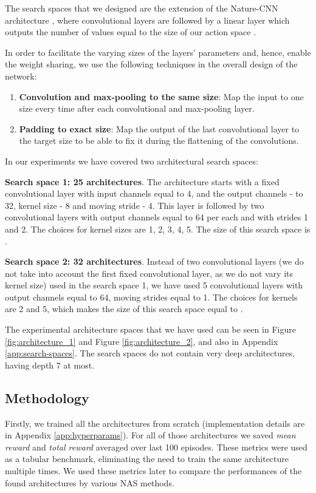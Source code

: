 \documentclass{svproc}
\begin{document}
The search spaces that we designed are the extension of the Nature-CNN architecture \cite{Humanlevel2015}, where convolutional layers are followed by
a linear layer which outputs the number of values equal to the size of our action space \cite{Humanlevel2015}. 




In order to facilitate the varying sizes of the layers' parameters and, hence, enable the weight sharing, we use the following techniques in the overall design of the network:
\begin{enumerate}
  \item \textbf{Convolution and max-pooling to the same size}:
  Map the input to one size every time after each convolutional and max-pooling layer. 
\item \textbf{Padding to exact size}:
  Map the output of the last convolutional layer to the target size to be able to fix it during the flattening of the convolutions.
  
\end{enumerate}

In our experiments we have covered two architectural search spaces:

\textbf{Search space 1: 25 architectures}.
The architecture starts with a fixed convolutional layer with input channels equal to 4, and the output channels - to 32, kernel size - 8 and moving stride - 4.
This layer is followed by two convolutional layers with output channels equal to 64 per each and with strides 1 and 2. The choices for kernel sizes are 1, 2, 3, 4, 5. The size of this search space is .

\textbf{Search space 2: 32 architectures}.
Instead of two convolutional layers (we do not take into account the first fixed convolutional layer, as we do not vary its kernel size) used in the search space 1, we have used 5 convolutional layers with output channels equal to 64, moving strides equal to 1. The choices for kernels are 2 and 5, which makes the size of this search space equal to .

The experimental architecture spaces that we have used can be seen in Figure \ref{fig:architecture_1} and Figure \ref{fig:architecture_2}, and also in Appendix \ref{app:search-spaces}.
The search spaces do not contain very deep architectures, having depth 7 at most.

\subsection{Methodology}
Firstly, we trained all the architectures from scratch (implementation details are in Appendix \ref{app:hyperparams}). For all of those architectures we saved \textit{mean reward} and \textit{total reward} averaged over last 100 episodes. 
These metrics were used as a tabular benchmark, eliminating the need to train the same architecture multiple times.
We used these metrics later to compare the performances of the found architectures by various NAS methods.
\end{document}

